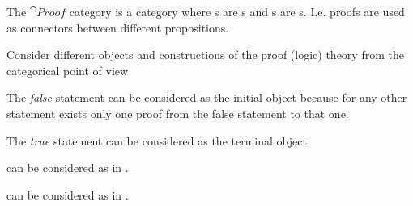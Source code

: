 \begin{definition}
\label{def:proof_category}
The $\cat{Proof}$ category is a category where s are
s and s are
s. I.e. proofs are used as connectors between
different propositions.
\end{definition}

Consider different objects and constructions of the proof (logic)
theory from the categorical point of view
\begin{example}
\label{ex:proof_initial_object}
The \textit{false} statement can be considered as the initial object
because for any other statement exists only one proof from the false
statement to that one.
\end{example}

\begin{example}
\label{ex:proof_terminal_object}
The \textit{true} statement can be considered as the terminal object
\end{example}

\begin{example}
\label{ex:proof_product}
 can be considered as
 in .
\end{example}

\begin{example}
\label{ex:proof_sum}
 can be considered as
 in .
\end{example}

